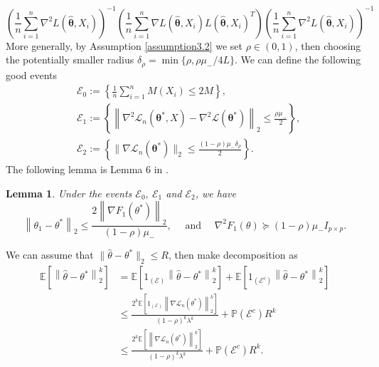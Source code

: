 \documentclass[12pt]{article}
\numberwithin{equation}{section}
\newtheorem{lemma}[theorem]{Lemma}
\begin{document}
\begin{equation}
\left(\frac{1}{n}\sum_{i=1}^n\nabla^2 L(\widehat{\boldsymbol{\theta}},X_i)\right)^{-1}\left(\frac{1}{n}\sum_{i=1}^n\nabla L(\widehat{\boldsymbol{\theta}},X_i)L(\widehat{\boldsymbol{\theta}},X_i)^T\right)\left(\frac{1}{n}\sum_{i=1}^n\nabla^2 L(\widehat{\boldsymbol{\theta}},X_i)\right)^{-1}
\end{equation}
More generally, by Assumption \ref{assumption3.2} we set $\rho \in (0,1)$, then choosing the potentially smaller radius $\delta_{\rho}=\min \{\rho, \rho \mu_{-} / 4 L\}$. We can define the following good events
\begin{align*}
&\mathcal{E}_{0}:=\left\{\frac{1}{n} \sum_{i=1}^{n} M\left(X_{i}\right) \leq 2 M\right\},\\
&\mathcal{E}_{1}:=\left\{\left\|\nabla^{2} \mathcal{L}_n\left(\boldsymbol{\theta}^{*},X\right)-\nabla^{2} \mathcal{L}\left(\boldsymbol{\theta}^{*}\right)\right\|_{2} \leq \frac{\rho\mu_{-}}{2}\right\},\\
&\mathcal{E}_2:=\left\{\|\nabla\mathcal{L}_n\left(\boldsymbol{\theta}^{*}\right)\|_2\leq \frac{(1-\rho) \mu_{-} \delta_{\rho}}{2}\right\}.
\end{align*}
The following lemma is Lemma 6 in \citet{zhang2013communication}.
\begin{lemma}\label{lemma3.7}
	Under the events $\mathcal{E}_0,\ \mathcal{E}_1$ and $\mathcal{E}_2$, we have
	\begin{equation}
	\left\|\theta_{1}-\theta^{*}\right\|_{2} \leq \frac{2\left\|\nabla F_{1}\left(\theta^{*}\right)\right\|_{2}}{(1-\rho) \mu_{-}}, \quad \text { and } \quad \nabla^{2} F_{1}(\theta) \succeq(1-\rho) \mu_{-} I_{p \times p}.
	\end{equation}
\end{lemma}
We can assume that $\|\hat \theta-\theta^{*}\|_2\leq R$, then make decomposition as
\begin{align*}
\mathbb{E}\left[\left\|\hat\theta-\theta^{*}\right\|_{2}^{k}\right] &=\mathbb{E}\left[1_{(\mathcal{E})}\left\|\hat\theta-\theta^{*}\right\|_{2}^{k}\right]+\mathbb{E}\left[1_{\left(\mathcal{E}^{c}\right)}\left\|\hat\theta-\theta^{*}\right\|_{2}^{k}\right] \\
& \leq \frac{2^{k} \mathbb{E}\left[1_{(\mathcal{E})}\left\|\nabla \mathcal{L}_n\left(\theta^{*}\right)\right\|_{2}^{k}\right]}{(1-\rho)^{k} \lambda^{k}}+\mathbb{P}\left(\mathcal{E}^{c}\right) R^{k} \\
& \leq \frac{2^{k} \mathbb{E}\left[\left\|\nabla \mathcal{L}_n\left(\theta^{*}\right)\right\|_{2}^{k}\right]}{(1-\rho)^{k} \lambda^{k}}+\mathbb{P}\left(\mathcal{E}^{c}\right) R^{k}.
\end{align*}
\end{document}
